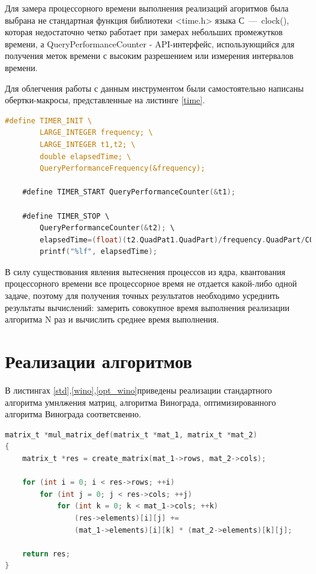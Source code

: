 \documentclass[a4paper,14pt, unknownkeysallowed]{extreport}
\begin{document}
Для замера процессорного времени выполнения реализаций агоритмов была выбрана не стандартная функция библиотеки <time.h> языка С~---~clock(), которая недостаточно четко работает при замерах небольших промежутков времени, а QueryPerformanceCounter - API-интерфейс, использующийся для получения меток времени с высоким разрешением или измерения интервалов времени.
        
Для облегчения работы с данным инструментом были самостоятельно написаны обертки-макросы, представленные на листинге \ref{time}.
        
\clearpage
        
\begin{lstlisting}[label= time,caption=Листинг макросов, используемых для замеров процессорного времени,language=C]
    #define TIMER_INIT \
        LARGE_INTEGER frequency; \
        LARGE_INTEGER t1,t2; \
        double elapsedTime; \
        QueryPerformanceFrequency(&frequency);
            
    #define TIMER_START QueryPerformanceCounter(&t1);
            
    #define TIMER_STOP \
        QueryPerformanceCounter(&t2); \
        elapsedTime=(float)(t2.QuadPat1.QuadPart)/frequency.QuadPart/COUNT*MICRO; \
        printf("%lf", elapsedTime);
\end{lstlisting}
		
В силу существования явления вытеснения процессов из ядра, квантования процессорного времени все процессорное время не отдается какой-либо одной задаче, поэтому для получения точных результатов необходимо усреднить результаты вычислений: замерить совокупное время выполнения реализации алгоритма N раз и вычислить среднее время выполнения.
		
\section{Реализации алгоритмов}
	
В листингах \ref{std},\ref{wino},\ref{opt_wino}приведены реализации стандартного алгоритма умнлжения матриц, алгоритма Винограда, оптимизированного алгоритма Винограда соответсвенно.

\clearpage

\begin{lstlisting}[label=std,caption=Листинг стандартного алгоритма умножения матриц,language=C]
matrix_t *mul_matrix_def(matrix_t *mat_1, matrix_t *mat_2)
{
    matrix_t *res = create_matrix(mat_1->rows, mat_2->cols);
        
    for (int i = 0; i < res->rows; ++i)
        for (int j = 0; j < res->cols; ++j)
            for (int k = 0; k < mat_1->cols; ++k)
                (res->elements)[i][j] += 
                (mat_1->elements)[i][k] * (mat_2->elements)[k][j];
    
    return res;
}
\end{lstlisting}
\end{document}
